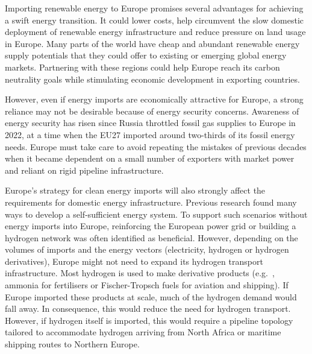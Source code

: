 
Importing renewable energy to Europe promises several advantages for achieving a
swift energy transition. It could lower costs, help circumvent the slow domestic
deployment of renewable energy infrastructure and reduce pressure on land usage
in Europe. Many parts of the world have cheap and abundant renewable energy
supply potentials that they could offer to existing or emerging global energy
markets.\cite{irenaGlobalHydrogen2022,luxSupplyCurves2021,vanderzwaanTimmermansDream2021,fasihiLongTermHydrocarbon2017,reichenbergDeepDecarbonization2022,galvanExportingSunshine2022,armijoFlexibleProduction2020,pfennigGlobalGISbasedPotential2023}
Partnering with these regions could help Europe reach its carbon neutrality
goals while stimulating economic development in exporting countries.


However, even if energy imports are economically attractive for Europe, a strong
reliance may not be desirable because of energy security concerns. Awareness of
energy security has risen since Russia throttled fossil gas supplies to Europe
in 2022,\cite{pedersenLongtermImplications2022} at a time when the EU27 imported
around two-thirds of its fossil energy needs.\cite{eurostatCompleteEnergy2023}
Europe must take care to avoid repeating the mistakes of previous decades when
it became dependent on a small number of exporters with market power and reliant
on rigid pipeline infrastructure.


Europe's strategy for clean energy imports will also strongly affect the
requirements for domestic energy infrastructure. Previous research found many
ways to develop a self-sufficient energy
system.\cite{pickeringDiversityOptions2022,trondleHomemadeImported2019,brownSynergiesSector2018}
To support such scenarios without energy imports into Europe, reinforcing the
European power grid or building a hydrogen network was often identified as
beneficial.\cite{neumannPotentialRole2023,victoriaSpeedTechnological2022}
However, depending on the volumes of imports and the energy vectors
(electricity, hydrogen or hydrogen derivatives), Europe might not need to expand
its hydrogen transport infrastructure. Most hydrogen is used to make derivative
products (e.g.~, ammonia for fertilisers or Fischer-Tropsch fuels for aviation
and shipping).\cite{neumannPotentialRole2023} If Europe imported these products
at scale, much of the hydrogen demand would fall away. In consequence, this
would reduce the need for hydrogen transport. However, if hydrogen itself is
imported, this would require a pipeline topology tailored to accommodate
hydrogen arriving from North Africa or maritime shipping routes to Northern
Europe.

